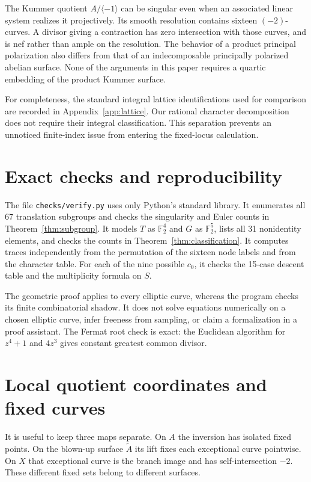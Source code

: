 \documentclass[11pt]{amsart}
\theoremstyle{definition}
\newcommand{\F}{\mathbb F}\newcommand{\Km}{\operatorname{Km}}
\begin{document}
The Kummer quotient $A/\langle-1\rangle$ can be singular even when
an associated linear system realizes it projectively. Its smooth
resolution contains sixteen $(-2)$-curves. A divisor giving a
contraction has zero intersection with those curves, and is nef
rather than ample on the resolution. The behavior of a product
principal polarization also differs from that of an indecomposable
principally polarized abelian surface. None of the arguments in this
paper requires a quartic embedding of the product Kummer surface.

For completeness, the standard integral lattice identifications used
for comparison are recorded in Appendix~\ref{app:lattice}. Our
rational character decomposition does not require their integral
classification. This separation prevents an unnoticed finite-index
issue from entering the fixed-locus calculation.

\section{Exact checks and reproducibility}
The file \texttt{checks/verify.py} uses only Python's standard library.
It enumerates all 67 translation subgroups and checks the singularity
and Euler counts in Theorem~\ref{thm:subgroup}.
It models $T$ as $\F_2^4$ and $G$ as $\F_2^5$, lists all 31
nonidentity elements, and checks the counts in
Theorem~\ref{thm:classification}. It computes traces independently
from the permutation of the sixteen node labels and from the
character table. For each of the nine possible $c_0$, it checks the
15-case descent table and the multiplicity formula on $S$.

The geometric proof applies to every elliptic curve, whereas the
program checks its finite combinatorial shadow. It does not solve
equations numerically on a chosen elliptic curve, infer freeness from
sampling, or claim a formalization in a proof assistant.
The Fermat root check is exact: the Euclidean algorithm for
$z^4+1$ and $4z^3$ gives constant greatest common divisor.

\appendix
\section{Local quotient coordinates and fixed curves}\label{app:local}
It is useful to keep three maps separate. On $A$ the inversion has
isolated fixed points. On the blown-up surface $\widetilde A$ its
lift fixes each exceptional curve pointwise. On $X$ that exceptional
curve is the branch image and has self-intersection $-2$.
These different fixed sets belong to different surfaces.
\end{document}
